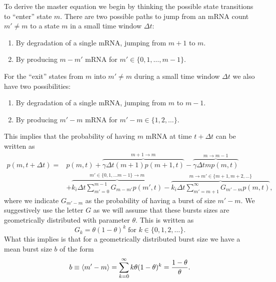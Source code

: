 To derive the master equation we begin by thinking the possible state
transitions to ``enter'' state $m$. There are two possible paths to jump from an
mRNA count $m' \neq m$ to a state $m$ in a small time window $\Delta t$:
\begin{enumerate}
        \item By degradation of a single mRNA, jumping from $m+1$ to $m$.
        \item By producing $m-m'$ mRNA for $m' \in \{0, 1, \ldots, m-1\}$.
\end{enumerate}
For the ``exit'' states from $m$ into $m' \neq m$ during a small time window
$\Delta t$ we also have two possibilities:
\begin{enumerate}
        \item By degradation of a single mRNA, jumping from $m$ to $m-1$.
        \item By producing $m'-m$ mRNA for $m'-m \in \{1, 2, \ldots\}$.
\end{enumerate}
This implies that the probability of having $m$ mRNA at time $t + \Delta t$ can
be written as
\begin{equation}
\begin{split}
p(m, t + \Delta t) = &p(m, t)
+ \overbrace{\gamma \Delta t (m + 1) p(m + 1, t)}^{m + 1 \rightarrow m}
- \overbrace{\gamma \Delta t m p(m, t)}^{m \rightarrow m - 1} \\
&+ \overbrace{k_i \Delta t \sum_{m'=0}^{m-1} G_{m-m'} p(m', t)}^
{m'\in \{0, 1, \ldots m-1\} \rightarrow m}
- \overbrace{k_i \Delta t \sum_{m'=m + 1}^{\infty} G_{m'-m} p(m, t)}^
{m \rightarrow m'\in \{m+1, m+2, \ldots\}},
\end{split}
\label{eq:si_master_deltat}
\end{equation}
where we indicate $G_{m'-m}$ as the probability of having a burst of size
$m'-m$. We suggestively use the letter $G$ as we will assume that these bursts
sizes are geometrically distributed with parameter $\theta$. This is written as
\begin{equation}
G_{k} = \theta (1 - \theta)^k\; \text{for } k \in \{0, 1, 2, \ldots \}.
\end{equation}
What this implies is that for a geometrically distributed burst size we have a
mean burst size $b$ of the form
\begin{equation}
b \equiv \left\langle m' - m \right\rangle 
= \sum_{k=0}^\infty k \theta (1 - \theta)^k = {1 - \theta \over \theta}.
\end{equation}

